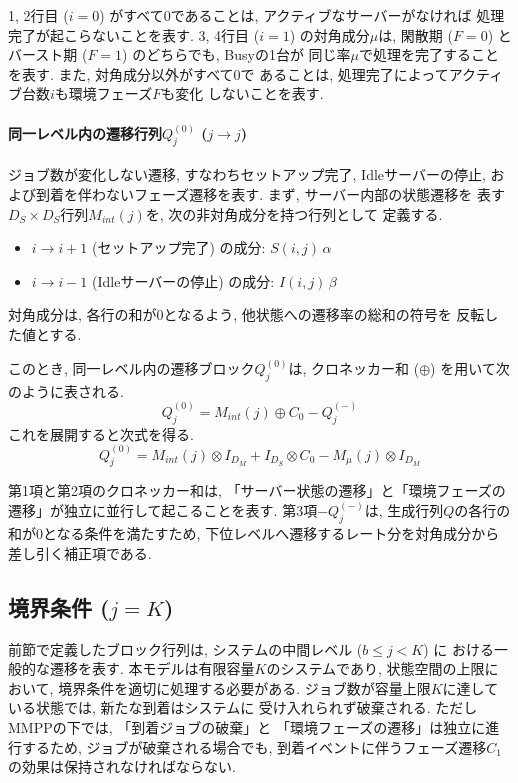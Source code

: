 \documentclass[a4paper, 11pt, dvipdfmx]{jsreport}
\begin{document}
1, 2行目 ($i=0$) がすべて$0$であることは, アクティブなサーバーがなければ
処理完了が起こらないことを表す. 3, 4行目 ($i=1$) の対角成分$\mu$は, 
閑散期 ($F=0$) とバースト期 ($F=1$) のどちらでも, Busyの1台が
同じ率$\mu$で処理を完了することを表す. また, 対角成分以外がすべて$0$で
あることは, 処理完了によってアクティブ台数$i$も環境フェーズ$F$も変化
しないことを表す. 

\paragraph{同一レベル内の遷移行列$Q^{(0)}_j$ ($j \to j$)}
\label{sec:q-zero}

ジョブ数が変化しない遷移, すなわちセットアップ完了, Idleサーバーの停止, 
および到着を伴わないフェーズ遷移を表す. まず, サーバー内部の状態遷移を
表す$D_S \times D_S$行列$M_{int}(j)$を, 次の非対角成分を持つ行列として
定義する. 
\begin{itemize}
    \item $i \to i+1$ (セットアップ完了) の成分: $S(i, j)\, \alpha$
    \item $i \to i-1$ (Idleサーバーの停止) の成分: $I(i, j)\, \beta$
\end{itemize}
対角成分は, 各行の和が$0$となるよう, 他状態への遷移率の総和の符号を
反転した値とする. 

このとき, 同一レベル内の遷移ブロック$Q^{(0)}_j$は, クロネッカー和
($\oplus$) を用いて次のように表される. 
\begin{equation}
    Q^{(0)}_{j} = M_{int}(j) \oplus C_0 - Q^{(-)}_{j}
\end{equation}
これを展開すると次式を得る. 
\begin{equation}
    Q^{(0)}_{j} = M_{int}(j) \otimes I_{D_M} + I_{D_S} \otimes C_0
        - M_\mu(j) \otimes I_{D_M}
\end{equation}

第1項と第2項のクロネッカー和は, 「サーバー状態の遷移」と「環境フェーズの遷移」が独立に並行して起こることを表す. 第3項$-Q^{(-)}_j$は, 生成行列$Q$の各行の和が$0$となる条件を満たすため, 下位レベルへ遷移するレート分を対角成分から差し引く補正項である. 

\subsection{境界条件 ($j = K$)}
\label{sec:boundary_conditions}
\label{sec:boundary-upper}

前節で定義したブロック行列は, システムの中間レベル ($b \le j < K$) に
おける一般的な遷移を表す. 本モデルは有限容量$K$のシステムであり, 
状態空間の上限において, 境界条件を適切に処理する必要がある. 
ジョブ数が容量上限$K$に達している状態では, 新たな到着はシステムに
受け入れられず破棄される. ただしMMPPの下では, 「到着ジョブの破棄」と
「環境フェーズの遷移」は独立に進行するため, ジョブが破棄される場合でも, 
到着イベントに伴うフェーズ遷移$C_1$の効果は保持されなければならない. 
\end{document}
